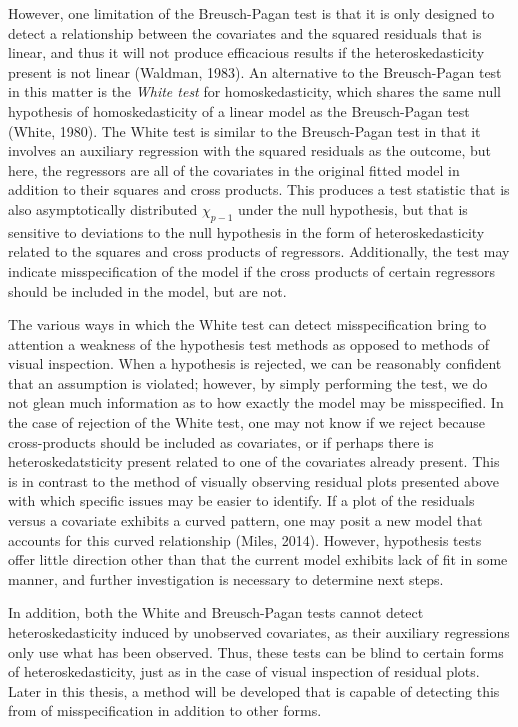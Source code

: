 		However, one limitation of the Breusch-Pagan test is that it is only designed to detect a relationship between the covariates and the squared residuals that is linear, and thus it will not
		produce efficacious results if the heteroskedasticity present is not linear (Waldman, 1983). An alternative to the Breusch-Pagan test in this matter is the \textit{White test} for homoskedasticity,
		which shares the same null hypothesis of homoskedasticity of a linear model as the Breusch-Pagan test (White, 1980). The White test is similar to the Breusch-Pagan test in that it involves
		an auxiliary regression with the squared residuals as the outcome, but here, the regressors are all of the covariates in the original fitted model in addition to their squares and cross
		products. This produces a test statistic that is also asymptotically distributed $\chi_{p-1}$ under the null hypothesis, but that is sensitive to deviations to the null hypothesis in the form of
		heteroskedasticity related to the squares and cross products of regressors. Additionally, the test may indicate misspecification of the model if the cross products of certain
		regressors should be included in the model, but are not.

		The various ways in which the White test can detect misspecification bring to attention a weakness of the hypothesis test methods as opposed to methods of visual inspection.
		When a hypothesis is rejected, we can be reasonably confident that an assumption is violated; however, by simply performing the test, we do not glean much information as to how exactly the
		model may be misspecified. In the case of rejection of the White test, one may not know if we reject because cross-products should be included as covariates, or if perhaps there is heteroskedatsticity
		present related to one of the covariates already present. This is in contrast to the method of visually observing residual plots presented above with which specific issues may be easier to identify.
		If a plot of the residuals versus a covariate exhibits a curved pattern, one may posit a new model that accounts for this curved relationship (Miles, 2014).
		However, hypothesis tests offer little direction other than that the current model exhibits lack of fit in some manner, and further investigation is necessary to determine next steps.

		In addition, both the White and Breusch-Pagan tests cannot detect heteroskedasticity induced by unobserved covariates, as their auxiliary regressions only use what has been observed.
		Thus, these tests can be blind to certain forms of heteroskedasticity, just as in the case of visual inspection of residual plots. Later in this thesis, a method will be developed
		that is capable of detecting this from of misspecification in addition to other forms.

